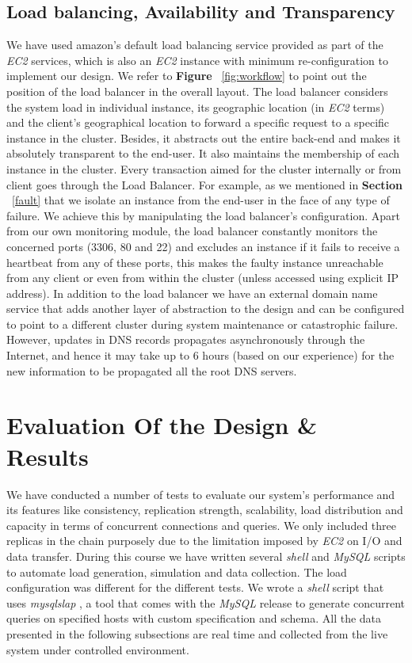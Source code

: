 \documentclass[12pt]{article}
\begin{document}
\subsection{Load balancing, Availability and Transparency}\label{lb.a.t}
We have used amazon's default load balancing service provided as part of the
\emph{EC2} services, which is also an \emph{EC2} instance with minimum
re-configuration to implement our design. We refer to \textbf{Figure
}~\ref{fig:workflow} to point out the position of the load balancer in the
overall layout. The load balancer considers the system load in individual
instance, its geographic location (in \emph{EC2} terms) and the client's
geographical location to forward a specific request to a specific instance in
the cluster. Besides, it abstracts out the entire back-end and makes it
absolutely transparent to the end-user. It also maintains the membership of each
instance in the cluster. Every transaction aimed for the cluster internally or
from client goes through the Load Balancer. For example, as we mentioned in
\textbf{Section }~\ref{fault} that we isolate an instance from the end-user in the face of any type of failure. We achieve this by manipulating the load balancer's configuration. Apart from our own monitoring module, the load balancer constantly monitors the concerned ports (3306, 80 and 22) and excludes an instance if it fails to receive a heartbeat from any of these ports, this makes the faulty instance unreachable from any client or even from within the cluster (unless accessed using explicit IP address). In addition to the load balancer we have an external domain name service that adds another layer of abstraction to the design and can be configured to point to a different cluster during system maintenance or catastrophic failure. However, updates in DNS records propagates asynchronously through the Internet, and hence it may take up to 6 hours (based on our experience) for the new information to be propagated all the root DNS servers.

\section{Evaluation Of the Design \& Results}
We have conducted a number of tests to evaluate our system's performance and its features like consistency, replication strength, scalability, load distribution and capacity in terms of concurrent connections and queries. We only included three replicas in the chain purposely due to the limitation imposed by \emph{EC2} \cite{freetier} on I/O and data transfer. During this course we have written several \emph{shell} and \emph{MySQL} scripts to automate load generation, simulation and data collection. The load configuration was different for the different tests. We wrote a \emph{shell} script that uses \emph{mysqlslap} \cite{mysqlslap}, a tool that comes with the \emph{MySQL} release to generate concurrent queries on specified hosts with custom specification and schema. All the data presented in the following subsections are real time and collected from the live system under controlled environment.
\end{document}

